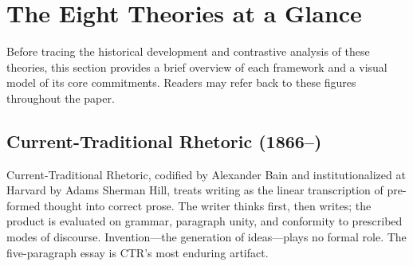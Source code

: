 \documentclass[12pt]{article}
\begin{document}
\section{The Eight Theories at a Glance}

Before tracing the historical development and contrastive analysis of these theories, this section provides a brief overview of each framework and a visual model of its core commitments. Readers may refer back to these figures throughout the paper.

\subsection{Current-Traditional Rhetoric (1866--)}

Current-Traditional Rhetoric, codified by Alexander Bain and institutionalized at Harvard by Adams Sherman Hill, treats writing as the linear transcription of pre-formed thought into correct prose. The writer thinks first, then writes; the product is evaluated on grammar, paragraph unity, and conformity to prescribed modes of discourse. Invention---the generation of ideas---plays no formal role. The five-paragraph essay is CTR's most enduring artifact.
\end{document}
